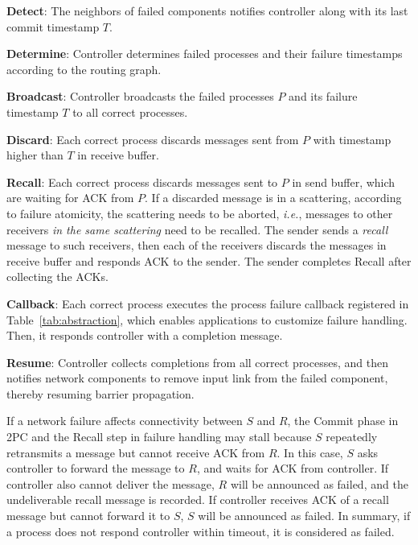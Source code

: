 \begin{ecompact}
\item \textbf{Detect}: The neighbors of failed components notifies controller along with its last commit timestamp $T$.
\item \textbf{Determine}: Controller determines failed processes and their failure timestamps according to the routing graph.
\item \textbf{Broadcast}: Controller broadcasts the failed processes $P$ and its failure timestamp $T$ to all correct processes.
\item \textbf{Discard}: Each correct process discards messages sent from $P$ with timestamp higher than $T$ in receive buffer.
\item \textbf{Recall}: Each correct process discards messages sent to $P$ in send buffer, which are waiting for ACK from $P$. If a discarded message is in a scattering, according to failure atomicity, the scattering needs to be aborted, \emph{i.e.}, messages to other receivers \emph{in the same scattering} need to be recalled. The sender sends a \emph{recall} message to such receivers, then each of the receivers discards the messages in receive buffer and responds ACK to the sender. The sender completes Recall after collecting the ACKs.
\item \textbf{Callback}: Each correct process executes the process failure callback registered in Table~\ref{tab:abstraction}, which enables applications to customize failure handling. Then, it responds controller with a completion message.
\item \textbf{Resume}: Controller collects completions from all correct processes, and then notifies network components to remove input link from the failed component, thereby resuming barrier propagation.
\end{ecompact}

 If a network failure affects connectivity between $S$ and $R$, the Commit phase in 2PC and the Recall step in failure handling may stall because $S$ repeatedly retransmits a message but cannot receive ACK from $R$.
In this case, $S$ asks controller to forward the message to $R$, and waits for ACK from controller. If controller also cannot deliver the message, $R$ will be announced as failed, and the undeliverable recall message is recorded. If controller receives ACK of a recall message but cannot forward it to $S$, $S$ will be announced as failed. In summary, if a process does not respond controller within timeout, it is considered as failed.

